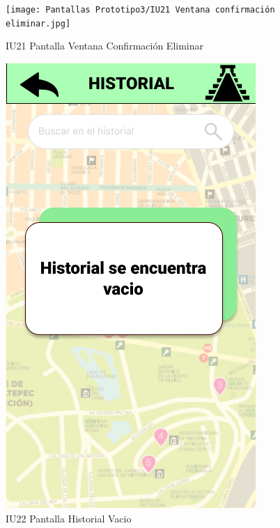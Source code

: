 \begin{figure}[h]
    \begin{minipage}{0.5\textwidth}
        \centering
        \texttt{[image: Pantallas Prototipo3/IU21 Ventana confirmación eliminar.jpg]}
        \caption{IU21 Pantalla Ventana Confirmación Eliminar}
    \end{minipage}
    
    \begin{minipage}{0.5\textwidth}
        \centering
        \includegraphics[width=.7\linewidth]{Pantallas Prototipo3/IU22 Historial vacio.jpg}
        \caption{IU22 Pantalla Historial Vacio}
    \end{minipage}%
\end{figure}
